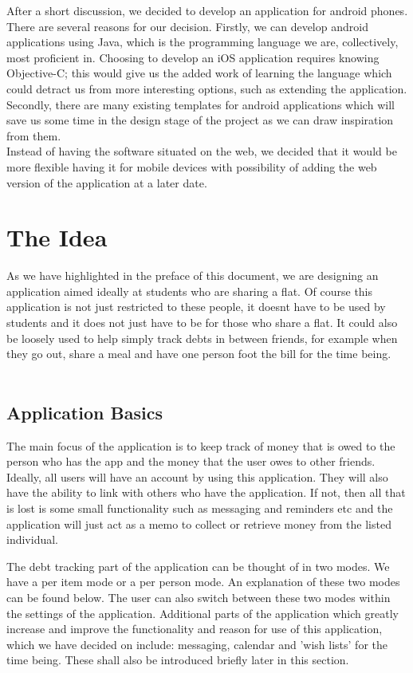 \documentclass[a4paper,9t]{article}
\begin{document}
After a short discussion, we decided to develop an application for android phones. There are several reasons for our decision. Firstly, we can develop android applications using Java, which is the programming language we are, collectively, most proficient in. Choosing to develop an iOS application requires knowing Objective-C; this would give us the added work of learning the language which could detract us from more interesting options, such as extending the application. Secondly, there are many existing templates for android applications which will save us some time in the design stage of the project as we can draw inspiration from them. \\
Instead of having the software situated on the web, we decided that it would be more flexible having it for mobile devices with possibility of adding the web version of the application at a later date. 

\section*{The Idea}
As we have highlighted in the preface of this document, we are designing an application aimed ideally at students who are sharing a flat. Of course this application is not just restricted to these people, it doesnt have to be used by students and it does not just have to be for those who share a flat. It could also be loosely used to help simply track debts in between friends, for example when they go out, share a meal and have one person foot the bill for the time being.\\
\\
\subsection*{Application Basics}
The main focus of the application is to keep track of money that is owed to the person who has the app and the money that the user owes to other friends. Ideally, all users will have an account by using this application. They will also have the ability to link with others who have the application. If not, then all that is lost is some small functionality such as messaging and reminders etc and the application will just act as a memo to collect or retrieve money from the listed individual. 

The debt tracking part of the application can be thought of in two modes. We have a per item mode or a per person mode. An explanation of these two modes can be found below. The user can also switch between these two modes within the settings of the application.  
Additional parts of the application which greatly increase and improve the functionality and reason for use of this application, which we have decided on include: messaging, calendar and 'wish lists' for the time being. These shall also be introduced briefly later in this section.
\end{document}
